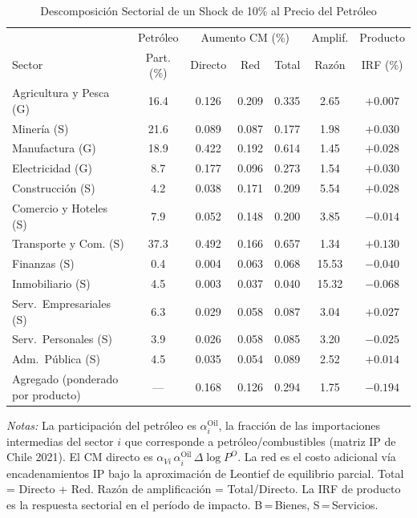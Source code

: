 \begin{table}[htbp]
\centering
\caption{Descomposición Sectorial de un Shock de 10\% al Precio del Petróleo}
\label{tab:oil_decomp}
\begin{threeparttable}
\small
\begin{tabular}{@{}l c c c c c c@{}}
\toprule
 & Petróleo & \multicolumn{3}{c}{Aumento CM (\%)} & Amplif. & Producto \\
\cmidrule(lr){3-5}
Sector & Part. (\%) & Directo & Red & Total & Razón & IRF (\%) \\
\midrule
Agricultura y Pesca (G) & 16.4 & 0.126 & 0.209 & 0.335 &  2.65 & $+0.007$ \\
Minería (S) & 21.6 & 0.089 & 0.087 & 0.177 &  1.98 & $+0.030$ \\
Manufactura (G) & 18.9 & 0.422 & 0.192 & 0.614 &  1.45 & $+0.028$ \\
Electricidad (G) &  8.7 & 0.177 & 0.096 & 0.273 &  1.54 & $+0.030$ \\
Construcción (S) &  4.2 & 0.038 & 0.171 & 0.209 &  5.54 & $+0.028$ \\
Comercio y Hoteles (S) &  7.9 & 0.052 & 0.148 & 0.200 &  3.85 & $-0.014$ \\
Transporte y Com. (S) & 37.3 & 0.492 & 0.166 & 0.657 &  1.34 & $+0.130$ \\
Finanzas (S) &  0.4 & 0.004 & 0.063 & 0.068 & 15.53 & $-0.040$ \\
Inmobiliario (S) &  4.5 & 0.003 & 0.037 & 0.040 & 15.32 & $-0.068$ \\
Serv.\ Empresariales (S) &  6.3 & 0.029 & 0.058 & 0.087 &  3.04 & $+0.027$ \\
Serv.\ Personales (S) &  3.9 & 0.026 & 0.058 & 0.085 &  3.20 & $-0.025$ \\
Adm.\ Pública (S) &  4.5 & 0.035 & 0.054 & 0.089 &  2.52 & $+0.014$ \\
\midrule
Agregado (ponderado por producto) & --- & 0.168 & 0.126 & 0.294 &  1.75 & $-0.194$ \\
\bottomrule
\end{tabular}
\begin{tablenotes}[flushleft]
\footnotesize
\item \textit{Notas:} La participación del petróleo es $\alpha^{\text{Oil}}_i$, la fracción de las importaciones intermedias del sector $i$ que corresponde a petróleo/combustibles (matriz IP de Chile 2021). El CM directo es $\alpha_{Vi}\,\alpha^{\text{Oil}}_i\,\Delta\log P^O$. La red es el costo adicional vía encadenamientos IP bajo la aproximación de Leontief de equilibrio parcial. Total = Directo + Red. Razón de amplificación = Total/Directo. La IRF de producto es la respuesta sectorial en el período de impacto. B\,=\,Bienes, S\,=\,Servicios.
\end{tablenotes}
\end{threeparttable}
\end{table}
